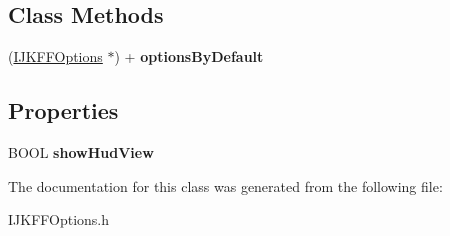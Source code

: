 \subsection*{Class Methods}
\begin{DoxyCompactItemize}
\item 
\mbox{\label{interface_i_j_k_f_f_options_a5e6d820f1ade12c655f10fffff169989}} 
(\hyperlink{interface_i_j_k_f_f_options}{I\+J\+K\+F\+F\+Options} $\ast$) + {\bfseries options\+By\+Default}
\end{DoxyCompactItemize}
\subsection*{Properties}
\begin{DoxyCompactItemize}
\item 
\mbox{\label{interface_i_j_k_f_f_options_a2c256d81ca38f13c3fa8e28c4efa74aa}} 
B\+O\+OL {\bfseries show\+Hud\+View}
\end{DoxyCompactItemize}


The documentation for this class was generated from the following file\+:\begin{DoxyCompactItemize}
\item 
I\+J\+K\+F\+F\+Options.\+h\end{DoxyCompactItemize}
